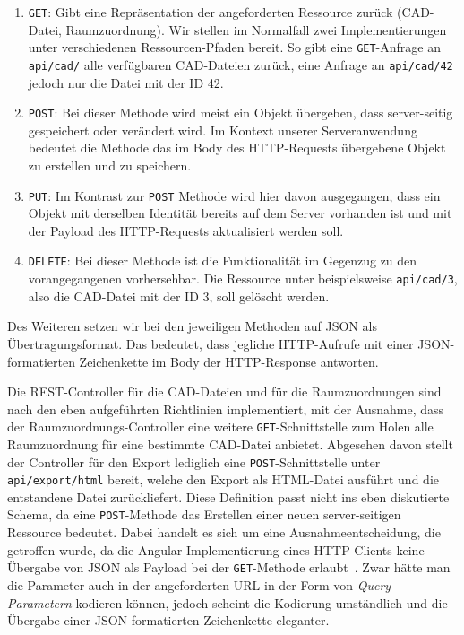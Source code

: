 \begin{enumerate}
    \item \texttt{GET}: Gibt eine Repräsentation der angeforderten Ressource zurück (CAD-Datei, Raumzuordnung).
    Wir stellen im Normalfall zwei Implementierungen unter verschiedenen Ressourcen-Pfaden bereit.
    So gibt eine \texttt{GET}-Anfrage an \texttt{api/cad/} alle verfügbaren CAD-Dateien zurück, eine Anfrage an \texttt{api/cad/42} jedoch nur die Datei mit der ID 42.
    \item \texttt{POST}: Bei dieser Methode wird meist ein Objekt übergeben, dass server-seitig gespeichert oder verändert wird.
    Im Kontext unserer Serveranwendung bedeutet die Methode das im Body des HTTP-Requests übergebene Objekt zu erstellen und zu speichern.
    \item \texttt{PUT}: Im Kontrast zur \texttt{POST} Methode wird hier davon ausgegangen, dass ein Objekt mit derselben Identität bereits auf dem Server vorhanden ist und mit der Payload des HTTP-Requests aktualisiert werden soll.
    \item \texttt{DELETE}: Bei dieser Methode ist die Funktionalität im Gegenzug zu den vorangegangenen vorhersehbar.
    Die Ressource unter beispielsweise \texttt{api/cad/3}, also die CAD-Datei mit der ID 3, soll gelöscht werden.
\end{enumerate}

Des Weiteren setzen wir bei den jeweiligen Methoden auf JSON als Übertragungsformat.
Das bedeutet, dass jegliche HTTP-Aufrufe mit einer JSON-formatierten Zeichenkette im Body der HTTP-Response antworten.

Die REST-Controller für die CAD-Dateien und für die Raumzuordnungen sind nach den eben aufgeführten Richtlinien implementiert, mit der Ausnahme, dass der Raumzuordnungs-Controller eine weitere \texttt{GET}-Schnittstelle zum Holen alle Raumzuordnung für eine bestimmte CAD-Datei anbietet.
Abgesehen davon stellt der Controller für den Export lediglich eine \texttt{POST}-Schnittstelle unter \texttt{api/export/html} bereit, welche den Export als HTML-Datei ausführt und die entstandene Datei zurückliefert.
Diese Definition passt nicht ins eben diskutierte Schema, da eine \texttt{POST}-Methode das Erstellen einer neuen server-seitigen Ressource bedeutet.
Dabei handelt es sich um eine Ausnahmeentscheidung, die getroffen wurde, da die Angular Implementierung eines HTTP-Clients keine Übergabe von JSON als Payload bei der \texttt{GET}-Methode erlaubt~\cite{AngularHttpClientGet}.
Zwar hätte man die Parameter auch in der angeforderten URL in der Form von \textit{Query Parametern} kodieren können, jedoch scheint die Kodierung umständlich und die Übergabe einer JSON-formatierten Zeichenkette eleganter.

